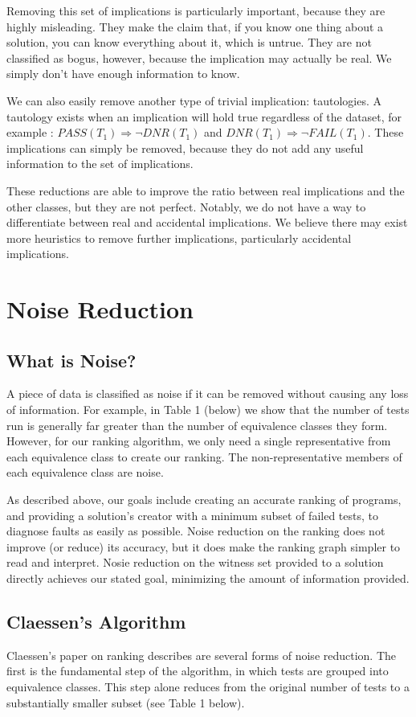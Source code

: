 \documentclass[11pt,twoside]{article}
\newcommand\dnr{\ensuremath{\mathit{DNR}}}
\newcommand\fail{\mathit{FAIL}}
\newcommand\pass{\mathit{PASS}}
\theoremstyle{definition}
\begin{document}
Removing this set of implications is particularly important, because they are highly misleading. They make the claim that, if you know one thing about a solution, you can know everything about it, which is untrue. They are not classified as bogus, however, because the implication may actually be real. We simply don't have enough information to know.

We can also easily remove another type of trivial implication: tautologies. A tautology exists when an implication will hold true regardless of the dataset, for example : $\pass(T_1) \Rightarrow \neg\dnr(T_1)$ and $\dnr(T_1) \Rightarrow \neg\fail(T_1)$. These implications can simply be removed, because they do not add any useful information to the set of implications.

These reductions are able to improve the ratio between real implications and the other classes, but they are not perfect. Notably, we do not have a way to differentiate between real and accidental implications. We believe there may exist more heuristics to remove further implications, particularly accidental implications.

\section{Noise Reduction}

\subsection{What is Noise?}
A piece of data is classified as noise if it can be removed without causing any loss of information. For example, in Table 1 (below) we show that the number of tests run is generally far greater than the number of equivalence classes they form. However, for our ranking algorithm, we only need a single representative from each equivalence class to create our ranking. The non-representative members of each equivalence class are noise. 

As described above, our goals include creating an accurate ranking of programs, and providing a solution's creator with a minimum subset of failed tests, to diagnose faults as easily as possible. Noise reduction on the ranking does not improve (or reduce) its accuracy, but it does make the ranking graph simpler to read and interpret. Nosie reduction on the witness set provided to a solution directly achieves our stated goal, minimizing the amount of information provided.


\subsection{Claessen's Algorithm}
Claessen's paper on ranking describes are several forms of noise reduction. The first is the fundamental step of the algorithm, in which tests are grouped into equivalence classes. This step alone reduces from the original number of tests to a substantially smaller subset (see Table 1 below).
\end{document}

